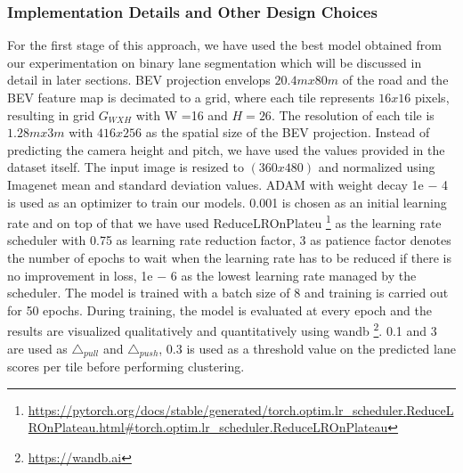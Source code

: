         \subsubsection{Implementation Details and Other Design Choices }
        For the first stage of this approach, we have used the best model obtained from our experimentation on binary lane segmentation which will be discussed in detail in later sections. BEV projection envelops $20.4m x 80m$ of the road and the BEV feature map is decimated to a grid, where each tile represents $16x16$ pixels, resulting in grid $G_{WXH}$ with W =16 and $H =26$. The resolution of each tile is $1.28m x 3m$ with $416x256$ as the spatial size of the BEV projection. Instead of predicting the camera height and pitch, we have used the values provided in the dataset itself.  The input image is
        resized to $(360x480)$ and normalized using Imagenet\cite{deng2009imagenet} mean and standard deviation values. ADAM with weight decay 1e − 4 is used as an optimizer to train our models. 0.001 is chosen as an initial learning rate and on top of that we have used ReduceLROnPlateu \footnote{\url{https://pytorch.org/docs/stable/generated/torch.optim.lr_scheduler.ReduceLROnPlateau.html#torch.optim.lr_scheduler.ReduceLROnPlateau}} as the learning rate scheduler with 0.75 as learning rate reduction factor, 3 as patience factor denotes the number of epochs to wait when the learning rate has to be reduced if there is no improvement in loss, 1e − 6 as the lowest learning rate managed by the scheduler. The model is trained with a batch size of 8 and training is carried out for 50 epochs. During training, the model is evaluated at every epoch and the results are visualized qualitatively and quantitatively using wandb \footnote{\url{https://wandb.ai}}. 0.1 and 3 are used as $\triangle_{pull}$ and $\triangle_{push}$, 0.3 is used as a threshold value on the predicted lane scores per tile before performing clustering.
        

